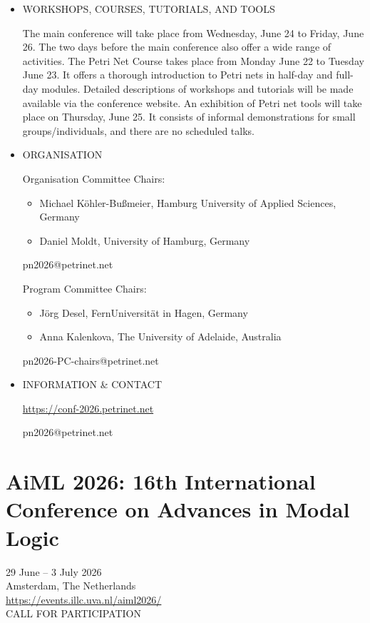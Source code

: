 \documentclass[prodmode,acmtecs]{acmsmall} %
\begin{document}
\begin{itemize}
  Submit via EasyChair: \href{https://easychair.org/conferences/?conf=petrinets2026}{https://easychair.org/conferences/?conf=petrinets2026}. 
 
\item  WORKSHOPS, COURSES, TUTORIALS, AND TOOLS 
 
  The main conference will take place from Wednesday, June 24 to Friday, June 26. The two days before the main conference also offer a wide range of activities. The Petri Net Course takes place from Monday June 22 to Tuesday June 23. It offers a thorough introduction to Petri nets in half-day and full-day modules. Detailed descriptions of workshops and tutorials will be made available via the conference website. An exhibition of Petri net tools will take place on Thursday, June 25. It consists of informal demonstrations for small groups/individuals, and there are no scheduled talks. 
 
\item  ORGANISATION 
 
  Organisation Committee Chairs: 
 
\begin{itemize}\item  Michael Köhler-Bußmeier, Hamburg University of Applied Sciences, Germany
\item  Daniel Moldt, University of Hamburg, Germany 
\end{itemize} 
   pn2026@petrinet.net 
 
  Program Committee Chairs: 
 
\begin{itemize}\item  Jörg Desel, FernUniversität in Hagen, Germany
\item  Anna Kalenkova, The University of Adelaide, Australia
\end{itemize} 
  pn2026-PC-chairs@petrinet.net 
 
\item  INFORMATION \& CONTACT 
 
  \href{https://conf-2026.petrinet.net}{https://conf-2026.petrinet.net} 
 
  pn2026@petrinet.net 
 
\end{itemize}\section{AiML 2026: 16th International Conference on Advances in Modal Logic }\label{AiML2026}  29 June – 3 July 2026\\ 
  Amsterdam, The Netherlands \\ 
  \href{https://events.illc.uva.nl/aiml2026/}{https://events.illc.uva.nl/aiml2026/} \\ 
CALL FOR PARTICIPATION 
\end{document}
